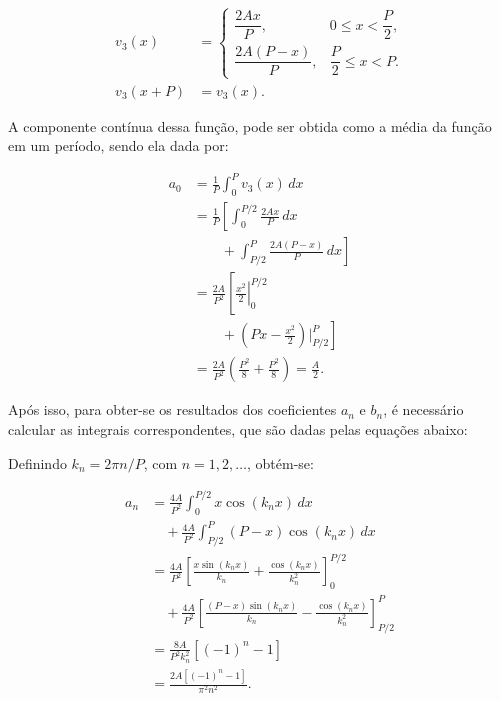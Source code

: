 \begin{equation}
    \begin{aligned}
        v_3(x) &= \begin{cases}
            \dfrac{2Ax}{P}, & 0 \leq x < \dfrac{P}{2}, \\[6pt]
            \dfrac{2A(P-x)}{P}, & \dfrac{P}{2} \leq x < P.
        \end{cases} \\
        v_3(x+P) &= v_3(x).
    \end{aligned}
\end{equation}

A componente contínua dessa função, pode ser obtida como a média da função em um período, sendo ela dada por:

\begin{equation}
    \begin{aligned}
        a_0 &= \frac{1}{P} \int_{0}^{P} v_3(x)\,dx \\
            &= \frac{1}{P} \left[
            \int_{0}^{P/2} \frac{2Ax}{P}\,dx \right. \\
            &\qquad \left.{}+ \int_{P/2}^{P}
            \frac{2A(P-x)}{P}\,dx \right] \\
            &= \frac{2A}{P^2} \left[
            \left.\frac{x^2}{2}\right|_{0}^{P/2} \right. \\
            &\qquad \left.{}+ \left(Px - \frac{x^2}{2}\right)
            \bigg|_{P/2}^{P} \right] \\
            &= \frac{2A}{P^2}
            \left(\frac{P^2}{8} + \frac{P^2}{8}\right)
            = \frac{A}{2}.
    \end{aligned}
\end{equation}

Após isso, para obter-se os resultados dos coeficientes $a_n$ e $b_n$, é necessário calcular as integrais correspondentes, que são dadas pelas equações abaixo:

Definindo $k_n = 2\pi n/P$, com $n = 1,2,\ldots$, obtém-se:

\begin{equation}
    \begin{aligned}
        a_n &= \frac{4A}{P^2} \int_{0}^{P/2}
            x\cos(k_n x)\,dx \\
            &\quad {}+ \frac{4A}{P^2} \int_{P/2}^{P}
            (P-x)\cos(k_n x)\,dx \\
            &= \frac{4A}{P^2} \left[
            \frac{x\sin(k_n x)}{k_n}
            + \frac{\cos(k_n x)}{k_n^2}\right]_{0}^{P/2} \\
            &\quad {}+ \frac{4A}{P^2} \left[
            \frac{(P-x)\sin(k_n x)}{k_n}
            - \frac{\cos(k_n x)}{k_n^2}\right]_{P/2}^{P} \\
            &= \frac{8A}{P^2 k_n^2}\left[(-1)^n - 1\right] \\
            &= \frac{2A\left[(-1)^n - 1\right]}{\pi^2 n^2}.
    \end{aligned}
\end{equation}

